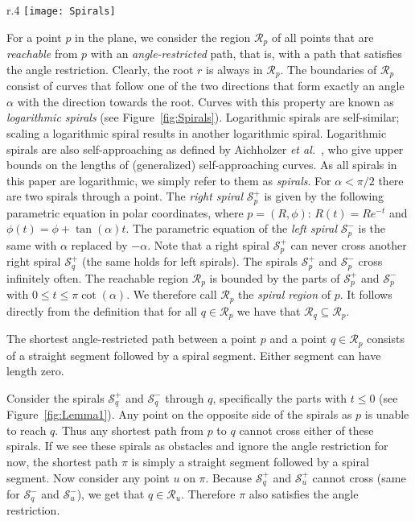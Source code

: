 \documentclass{journalA4}
\newcommand{\etal}{{\emph{et al.}\xspace}}
\begin{document}
\bigskip

\begin{wrapfigure}[10]{r}{.4\textwidth}
  \centering
  \texttt{[image: Spirals]}
  \small{\caption{Spirals and spiral regions.\label{fig:Spirals}}}
\end{wrapfigure}
\smallskip{} For a point $p$ in the plane, we consider the region $\mathcal{R}_p$ of all points that are \emph{reachable} from $p$ with an \emph{angle-restricted} path, that is, with a path that satisfies the angle restriction.
Clearly, the root $r$ is always in $\mathcal{R}_p$. The boundaries of $\mathcal{R}_p$ consist of curves that follow one of the two directions that form exactly an angle $\alpha$ with the direction towards the root. Curves with this property are known as \emph{logarithmic spirals} (see Figure~\ref{fig:Spirals}). Logarithmic spirals are self-similar; scaling a logarithmic spiral results in another logarithmic spiral. Logarithmic spirals are also self-approaching as defined by Aichholzer \etal~\cite{Aichholzer2001}, who give upper bounds on the lengths of (generalized) self-approaching curves. As all spirals in this paper are logarithmic, we simply refer to them as \emph{spirals}. For $\alpha < \pi/2$ there are two spirals through a point. The \emph{right spiral} $\mathcal{S}^{+}_p$ is given by the following parametric equation in polar coordinates, where $p = (R, \phi)$: $R(t) = R e^{-t}$ and $\phi(t) = \phi + \tan(\alpha) t$.
The parametric equation of the \emph{left spiral} $\mathcal{S}^{-}_p$ is the same with $\alpha$ replaced by $-\alpha$. Note that a right spiral $\mathcal{S}^{+}_p$ can never cross another right spiral $\mathcal{S}^{+}_q$ (the same holds for left spirals).
The spirals $\mathcal{S}^{+}_p$ and $\mathcal{S}^{-}_p$ cross infinitely often. The reachable region $\mathcal{R}_p$ is bounded by the parts of $\mathcal{S}^{+}_p$ and $\mathcal{S}^{-}_p$ with
$0 \leq t \leq \pi \cot(\alpha)$. We therefore call $\mathcal{R}_p$ the \emph{spiral region} of $p$. It follows directly from the definition that for all $q \in \mathcal{R}_p$ we have that $\mathcal{R}_q \subseteq \mathcal{R}_p$.

\begin{lemma}
\label{lem:shortestpath}
The shortest angle-restricted path between a point $p$ and a point $q \in \mathcal{R}_p$ consists of a straight segment followed by a spiral segment. Either segment can have length zero.
\end{lemma}
\medskip

Consider the spirals $\mathcal{S}^{+}_q$ and $\mathcal{S}^{-}_q$ through $q$, specifically the parts with $t \leq 0$ (see Figure~\ref{fig:Lemma1}). Any point on the opposite side of the spirals as $p$ is unable to reach $q$. Thus any shortest path from $p$ to $q$ cannot cross either of these spirals. If we see these spirals as obstacles and ignore the angle restriction for now, the shortest path $\pi$ is simply a straight segment followed by a spiral segment. Now consider any point $u$ on $\pi$. Because $\mathcal{S}^{+}_q$ and $\mathcal{S}^{+}_u$ cannot cross (same for $\mathcal{S}^{-}_q$ and $\mathcal{S}^{-}_u$), we get that $q \in \mathcal{R}_u$. Therefore $\pi$ also satisfies the angle restriction.\hfill\QED
\end{document}
